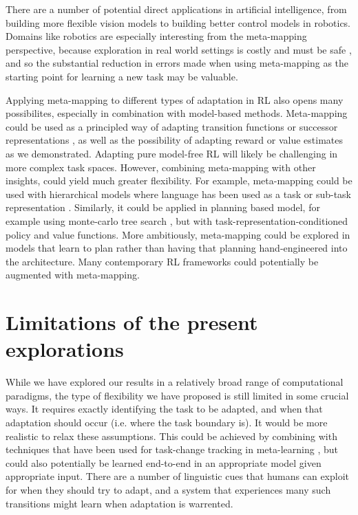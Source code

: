 There are a number of potential direct applications in artificial intelligence, from building more flexible vision models to building better control models in robotics. Domains like robotics are especially interesting from the meta-mapping perspective, because exploration in real world settings is costly and must be safe \citep{Turchetta2016}, and so the substantial reduction in errors made when using meta-mapping as the starting point for learning a new task may be valuable. \par 

Applying meta-mapping to different types of adaptation in RL also opens many possibilites, especially in combination with model-based methods. Meta-mapping could be used as a principled way of adapting transition functions or successor representations \citep[c.f.][]{Madarasz2019}, as well as the possibility of adapting reward or value estimates as we demonstrated. Adapting pure model-free RL will likely be challenging in more complex task spaces. However, combining meta-mapping with other insights, could yield much greater flexibility. For example, meta-mapping could be used with hierarchical models where language has been used as a task or sub-task representation \citep[e.g.][]{Jiang2019}. Similarly, it could be applied in planning based model, for example using monte-carlo tree search \citep[as in e.g.][]{Silver2016, Silver2017}, but with task-representation-conditioned policy and value functions. More ambitiously, meta-mapping could be explored in models that learn to plan \citep{Guez2019} rather than having that planning hand-engineered into the architecture. Many contemporary RL frameworks could potentially be augmented with meta-mapping. \par

\section{Limitations of the present explorations}

While we have explored our results in a relatively broad range of computational paradigms, the type of flexibility we have proposed is still limited in some crucial ways. It requires exactly identifying the task to be adapted, and when that adaptation should occur (i.e. where the task boundary is). It would be more realistic to relax these assumptions. This could be achieved by combining with techniques that have been used for task-change tracking in meta-learning \citep[e.g.][]{Nagabandi2019}, but could also potentially be learned end-to-end in an appropriate model given appropriate input. There are a number of linguistic cues that humans can exploit for when they should try to adapt, and a system that experiences many such transitions might learn when adaptation is warrented. \par 

